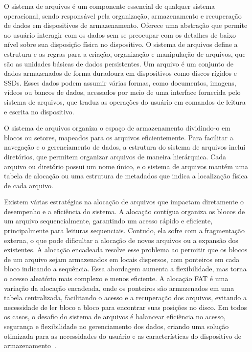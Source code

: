 \documentclass[
    12pt,				%
    oneside,   	        %
    a4paper,			%
    english,			%
    french,				%
    spanish,			%
    brazil,				%
    ]{pacotes/abntex2}
\begin{document}
O sistema de arquivos é um componente essencial de qualquer sistema operacional, sendo responsável pela organização, armazenamento e recuperação de dados em dispositivos de armazenamento. Oferece uma abstração que permite ao usuário interagir com os dados sem se preocupar com os detalhes de baixo nível sobre sua disposição física no dispositivo. O sistema de arquivos define a estrutura e as regras para a criação, organização e manipulação de arquivos, que são as unidades básicas de dados persistentes. Um arquivo é um conjunto de dados armazenados de forma duradoura em dispositivos como discos rígidos e SSDs. Esses dados podem assumir várias formas, como documentos, imagens, vídeos ou bancos de dados, acessados por meio de uma interface fornecida pelo sistema de arquivos, que traduz as operações do usuário em comandos de leitura e escrita no dispositivo.

O sistema de arquivos organiza o espaço de armazenamento dividindo-o em blocos ou setores, mapeados para os arquivos eficientemente. Para facilitar a navegação e o gerenciamento de dados, a estrutura do sistema de arquivos inclui diretórios, que permitem organizar arquivos de maneira hierárquica. Cada arquivo ou diretório possui um nome único, e o sistema de arquivos mantém uma tabela de alocação ou uma estrutura de metadados que indica a localização física de cada arquivo.

 Existem várias estratégias na alocação de arquivos que impactam diretamente o desempenho e a eficiência do sistema. A alocação contígua organiza os blocos de um arquivo sequencialmente, garantindo um acesso rápido e eficiente, principalmente para leituras sequenciais. Contudo, ela sofre com a fragmentação externa, o que pode dificultar a alocação de novos arquivos ou a expansão dos existentes. A alocação encadeada resolve esse problema ao permitir que os blocos de um arquivo sejam armazenados em locais dispersos, com ponteiros em cada bloco indicando a sequência. Essa abordagem aumenta a flexibilidade, mas torna o acesso aleatório mais complexo e menos eficiente. A alocação FAT é uma variação da alocação encadeada, onde os ponteiros são armazenados em uma tabela centralizada, facilitando o acesso e a recuperação dos arquivos, evitando a necessidade de ler bloco a bloco para encontrar suas posições no disco. Em todos os casos, o desafio do sistema de arquivos é balancear eficiência no acesso, segurança e flexibilidade no gerenciamento dos dados, criando uma solução otimizada para as necessidades do usuário e as características do dispositivo de armazenamento~\cite{maziero2019}.
\end{document}
